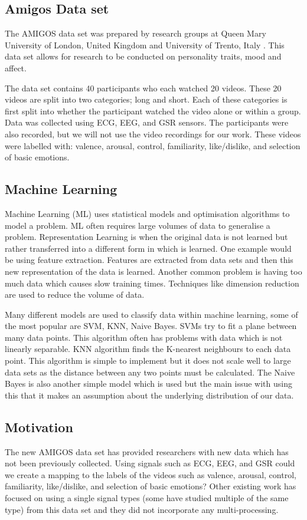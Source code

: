 \subsection{Amigos Data set}
The AMIGOS data set was prepared by research groups at
Queen Mary University of London, United Kingdom and
University of Trento, Italy \cite{AMIGOS:2018}.
This data set allows for research to be conducted on
personality traits, mood and affect.

The data set contains 40 participants who each watched 20 videos.
These 20 videos are split into two categories; long and short.
Each of these categories is first split into
whether the participant watched the video alone or within a group.
Data was collected using ECG, EEG, and GSR sensors.
The participants were also recorded, but we will not use the video recordings
for our work.
These videos were labelled with:
valence, arousal, control, familiarity, like/dislike,
and selection of basic emotions.

\subsection{Machine Learning}
Machine Learning (ML) uses statistical models and
optimisation algorithms to model a problem.
ML often requires large volumes of data to generalise a problem.
Representation Learning is when the original data is not learned
but rather transferred into a different form in which is learned.
One example would be using feature extraction.
Features are extracted from data sets and then this new representation of the data
is learned.
Another common problem is having too much data which causes slow training times.
Techniques like dimension reduction are used to reduce the volume of
data.

Many different models are used to classify data within machine learning,
some of the most popular are SVM, KNN, Naive Bayes.
SVMs try to fit a plane between many data points.
This algorithm often has problems with data which is not
linearly separable.
KNN algorithm finds the K-nearest neighbours to each data point.
This algorithm is simple to implement but it does not scale well
to large data sets as the distance between any two points must be calculated.
The Naive Bayes is also another simple model which is used but the main issue
with using this that it makes an assumption about the underlying distribution of
our data.

\subsection{Motivation}
The new AMIGOS data set has provided researchers with new
data which has not been previously collected.
Using signals such as ECG, EEG, and GSR
could we create a mapping to the
labels of the videos such as
valence, arousal, control, familiarity, like/dislike,
and selection of basic emotions?
Other existing work has focused on using a single signal types
(some have studied multiple of the same type) from this data set
and they did not incorporate any multi-processing.
